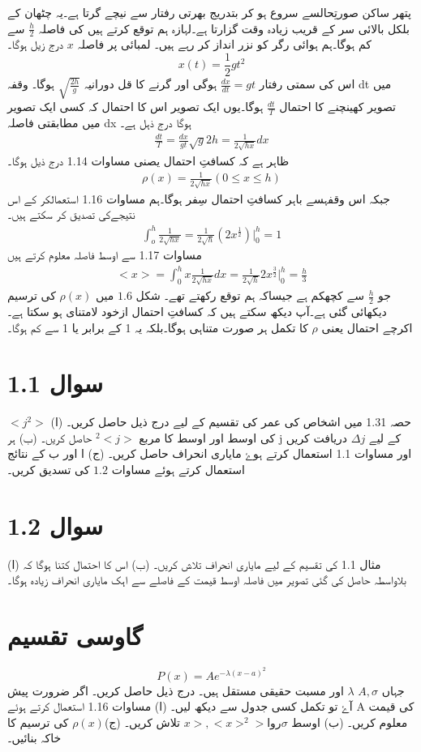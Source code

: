 \documentclass{article}
\begin{document}
پتھر ساکن صورتِحالسے سروع ہو کر بتدریج بھرتی رفتار سے نیچے گرتا ہے۔یہ چٹھان کے بلکل بالائی سر کے قریب زیادہ وقت گزارتا ہے۔لہازہ ہم توقع کرتے ہیں کی فاصلہ $   \frac{h}{2}   $ سے کم ہوگا۔ہم ہوائی رگر کو نزر انداز کر رہے ہیں۔ لمبائی پر فاصلہ $x$ درج زیل ہوگا۔
$$ x(t) = \frac{1}{2} gt^2 $$
اس کی سمتی رفتار $ \frac{dx}{dt}=gt $ ہوگی اور گرنے کا قل دورانیہ $           \sqrt{\frac{2h}{g}}  $ ہوگا۔ وقفہ dt میں تصویر کھینچنے کا احتمال $\frac{dt}{T}$ ہوگا۔یوں ایک تصویر اس کا احتمال کہ کسی ایک تصویر میں مطابقتی فاصلہ dx ہوگا درج  ذہل ہے۔ 
 \begin{align}
 \frac{dt}{T} = \frac{dx}{gt}\sqrt{g}{2h} = \frac{1}{2\sqrt{hx}}dx
\end{align}   
 ظاہر ہے کہ کسافتِ احتمال یصنی مساوات 1.14 درج ذیل ہوگا۔
 \begin{align}
 \rho(x)=\frac{1}{2\sqrt{hx}}  (0\leq x\leq h)
 \end{align}
 جبکہ اس وقفہسے باہر کسافتِ احتمال سِفر ہوگا۔ہم مساوات 1.16 استعمالکر کے اس نتیجےکی تصدیق کر سکتے ہیں۔
 \begin{align}
 \int_o^h \frac{1}{2\sqrt{hx}} =\frac{1}{2\sqrt{h}}(2x^{\frac{1}{2}})|_0^h =1
 \end{align}
 مساوات 1.17 سے اوسط فاصلہ معلوم کرتے ہیں
 \begin{align}
 <x> =\int_0^h x\frac{1}{2\sqrt{hx}}dx= \frac{1}{2\sqrt{h}} 2x^{\frac{3}{2}}|_0^h = \frac{h}{3}
 \end{align}
 جو  $ \frac{h}{2}$   سے کچھکم ہے جیساکہ ہم توقع رکھتے  تھے۔ شکل $1.6$ میں   $ \rho(x) $ کی ترسیم دیکھائی گئی ہے۔آپ دیکھ سکتے ہیں کہ کسافتِ احتمال ازخود لامتنای ہو سکتا ہے۔ اکرچے احتمال یعنی $ \rho $ کا تکمل ہر صورت متناہی ہوگا۔بلکہ یہ 1 کے برابر یا 1 سے کم ہوگا۔
\section*{ سوال 1.1} 
 حصہ 1.31 میں اشخاص کی عمر کی تقسیم کے لیے درج ذیل حاصل کریں۔ 
 (ا) $ <j^2>$ کی اوسط اور اوسط کا مربع $ ^2<j> $ حاصل کریں۔   
 (ب) ہر j  کے لیے $ \Delta j $ دریافت کریں اور مساوات 1.1 استعمال کرتے ہوۓ مایاری انحراف حاصل کریں۔
 (ج) ا اور ب کے نتائج استعمال کرتے ہوئے مساوات   $1.2  $ کی تسدیق کریں۔ 
 \section*{سوال 1.2} 
 (ا) مثال 1.1 کی تقسیم کے لیے مایاری انحراف تلاش کریں۔
 (ب) اس کا احتمال کتنا ہوگا کہ بلاواسطہ حاصل کی گئی تصویر میں فاصلہ اوسط قیمت کے فاصلے سے اہک مایاری انحراف زیادہ ہوگا۔
\section*{ گاوسی تقسیم}
 $$ P(x)=Ae^{-\lambda(x-a)^2} $$
 جہاں    $ A, \sigma $ $ \lambda $ اور مسبت حقیقی مستقل ہیں۔ درج ذیل حاصل کریں۔
   اگر ضرورت پیش آۓ تو تکمل کسی جدول سے دیکھ لیں۔
   (ا) مساوات 1.16 استعمال کرتے ہوئے  A کی قیمت معلوم کریں۔
   (ب)  اوسط $ x> , <x>^2>  اور   \sigma  $ تلاش کریں۔
   (ج)$ \rho(x) $ کی ترسیم کا خاکہ بنائیں۔
\end{document}
